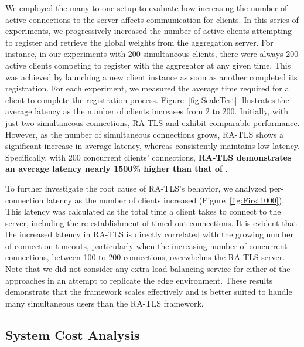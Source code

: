 We employed the many-to-one setup to evaluate how increasing the number of active connections to the server affects communication for clients. In this series of experiments, we progressively increased the number of active clients attempting to register and retrieve the global weights from the aggregation server. For instance, in our experiments with 200 simultaneous clients, there were always 200 active clients competing to register with the aggregator at any given time. This was achieved by launching a new client instance as soon as another completed its registration. For each experiment, we measured the average time required for a client to complete the registration process.
Figure~\ref{fig:ScaleTest} illustrates the average latency as the number of clients increases from 2 to 200. Initially, with just two simultaneous connections, RA-TLS and \sysname exhibit comparable performance. However, as the number of simultaneous connections grows, RA-TLS shows a significant increase in average latency, whereas \sysname consistently maintains low latency. 
Specifically, with 200 concurrent clients' connections, \textbf{RA-TLS demonstrates an average latency nearly 1500\% higher than that of \sysname}.

To further investigate the root cause of RA-TLS’s behavior, we analyzed per-connection latency as the number of clients increased (Figure~\ref{fig:First1000}). This latency was calculated as the total time a client takes to connect to the server, including the re-establishment of timed-out connections. It is evident that the increased latency in RA-TLS is directly correlated with the growing number of connection timeouts, particularly when the increasing number of concurrent connections, between 100 to 200 connections, overwhelms the RA-TLS server. Note that we did not consider any extra load balancing service for either of the approaches in an attempt to replicate the edge environment.
These results demonstrate that the \sysname framework scales effectively and is better suited to handle many simultaneous users than the RA-TLS framework.



\subsection{System Cost Analysis}











